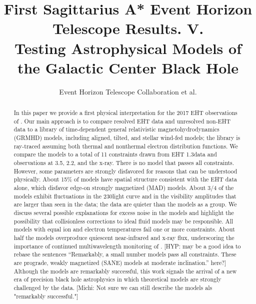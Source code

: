 \documentclass[twocolumn,twocolappendix,tighten,dvipsnames,linenumbers]{aastex63}
\newcommand\hyp[1]{{\color{Salmon}[HYP: #1]}}
\newcommand\michi[1]{{\color{Brown}[Michi: #1]}}
\begin{document}
\title{First Sagittarius A* Event Horizon Telescope Results. V.\\
  Testing Astrophysical Models of the Galactic Center Black Hole}

%
\author{Event Horizon Telescope Collaboration et al.}


\received{\today}
\revised{\today}

\begin{abstract}
  In this paper we provide a first physical interpretation for the
  2017 EHT observations of \sgra.
  Our main approach is to compare resolved EHT data and unresolved
  non-EHT data to a library of time-dependent general relativistic
  magnetohydrodynamics (GRMHD) models, including aligned, tilted, and
  stellar wind-fed models; the library is ray-traced assuming both
  thermal and nonthermal electron distribution functions.
  We compare the models to a total of 11 constraints drawn from EHT
  1.3\mm data and observations at 3.5\mm, 2.2\um, and the x-ray.
  There is no model that passes all constraints.
  However, some parameters are strongly disfavored for
  reasons that can be understood physically.
  About 15\% of models have spatial structure consistent with the EHT
  data alone, which disfavor edge-on strongly magnetized (MAD) models.
  About 3/4 of the models exhibit fluctuations in the 230\GHz light
  curve and in the visibility amplitudes that are larger than seen in
  the data; the data are quieter than the models as a group.
  We discuss several possible explanations for excess noise in the
  models and highlight the possibility that collisionless corrections
  to ideal fluid models may be responsible.
  All models with equal ion and electron temperatures fail one or more
  constraints.
  About half the models overproduce quiescent near-infrared and x-ray
  flux, underscoring the importance of continued multiwavelength
  monitoring of \sgra.
  \hyp{may be a good idea to rebase the sentences ``Remarkably, a
    small number models pass all constraints.
    These are prograde, weakly magnetized (SANE) models at moderate
    inclination.'' here?}
  Although the models are remarkably successful, this work signals the
  arrival of a new era of precision black hole astrophysics in which
  theoretical models are strongly challenged by the data.
  \michi{Not sure we can still describe the models als "remarkably successful."}
\end{abstract}
\end{document}
